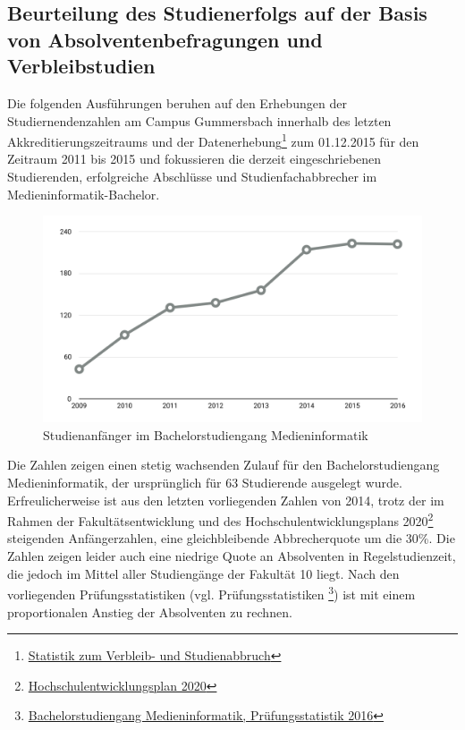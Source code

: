 \subsection{Beurteilung des Studienerfolgs auf der Basis von
Absolventenbefragungen und
Verbleibstudien}\label{beurteilung-des-studienerfolgs-auf-der-basis-von-absolventenbefragungen-und-verbleibstudien}

Die folgenden Ausführungen beruhen auf den Erhebungen der
Studiernendenzahlen am Campus Gummersbach innerhalb des letzten
Akkreditierungszeitraums und der Datenerhebung\footnote{\href{https://th-koeln.github.io/mi-2017/anhaenge/stat-verbleib-und-studienabbruch.pdf}{Statistik
  zum Verbleib- und Studienabbruch}} zum 01.12.2015 für den Zeitraum
2011 bis 2015 und fokussieren die derzeit eingeschriebenen Studierenden,
erfolgreiche Abschlüsse und Studienfachabbrecher im
Medieninformatik-Bachelor.

\begin{figure}[htbp]
\centering
\includegraphics[width=\columnwidth]{../anhaenge/bilder/ba-anfaengerzahlen.png}
\caption{Studienanfänger im Bachelorstudiengang Medieninformatik}
\end{figure}

Die Zahlen zeigen einen stetig wachsenden Zulauf für den
Bachelorstudiengang Medieninformatik, der ursprünglich für 63
Studierende ausgelegt wurde. Erfreulicherweise ist aus den letzten
vorliegenden Zahlen von 2014, trotz der im Rahmen der
Fakultätsentwicklung und des Hochschulentwicklungsplans 2020\footnote{\href{https://www.verwaltung.th-koeln.de/imperia/md/content/verwaltung/broschueren_leitfaeden/hochschulentwicklungsplan2020.pdf}{Hochschulentwicklungsplan
  2020}} steigenden Anfängerzahlen, eine gleichbleibende Abbrecherquote
um die 30\%. Die Zahlen zeigen leider auch eine niedrige Quote an
Absolventen in Regelstudienzeit, die jedoch im Mittel aller Studiengänge
der Fakultät 10 liegt. Nach den vorliegenden Prüfungsstatistiken (vgl.
Prüfungsstatistiken \footnote{\href{https://th-koeln.github.io/mi-2017/anhaenge/ba-pruefungsstatistiken.pdf}{Bachelorstudiengang
  Medieninformatik, Prüfungsstatistik 2016}}) ist mit einem
proportionalen Anstieg der Absolventen zu rechnen.

